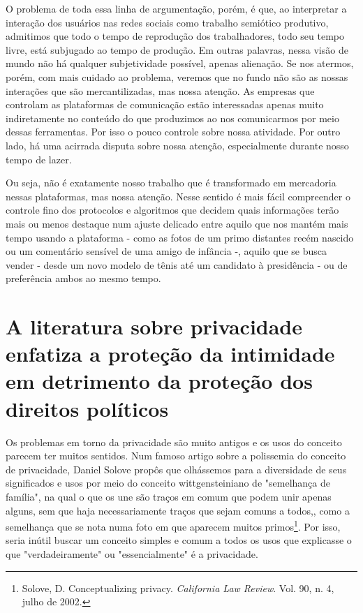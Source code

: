 O problema de toda essa linha de argumentação, porém, é que, ao
interpretar a interação dos usuários nas redes sociais como trabalho
semiótico produtivo, admitimos que todo o tempo de reprodução dos
trabalhadores, todo seu tempo livre, está subjugado ao tempo de
produção. Em outras palavras, nessa visão de mundo não há qualquer
subjetividade possível, apenas alienação. Se nos atermos, porém, com
mais cuidado ao problema, veremos que no fundo não são as nossas
interações que são mercantilizadas, mas nossa atenção. As empresas que
controlam as plataformas de comunicação estão interessadas apenas muito
indiretamente no conteúdo do que produzimos ao nos comunicarmos por meio
dessas ferramentas. Por isso o pouco controle sobre nossa atividade. Por
outro lado, há uma acirrada disputa sobre nossa atenção, especialmente
durante nosso tempo de lazer.

Ou seja, não é exatamente nosso trabalho que é transformado em
mercadoria nessas plataformas, mas nossa atenção. Nesse sentido é mais
fácil compreender o controle fino dos protocolos e algoritmos que
decidem quais informações terão mais ou menos destaque num ajuste
delicado entre aquilo que nos mantém mais tempo usando a plataforma -
como as fotos de um primo distantes recém nascido ou um comentário
sensível de uma amigo de infância -, aquilo que se busca vender - desde
um novo modelo de tênis até um candidato à presidência - ou de
preferência ambos ao mesmo tempo.

\section{A literatura sobre privacidade enfatiza a proteção da intimidade
em detrimento da proteção dos direitos políticos}

Os problemas em torno da privacidade são muito antigos e os usos do
conceito parecem ter muitos sentidos. Num famoso artigo sobre a
polissemia do conceito de privacidade, Daniel Solove propôs que
olhássemos para a diversidade de seus significados e usos por meio do
conceito wittgensteiniano de "semelhança de família", na qual o que os
une são traços em comum que podem unir apenas alguns, sem que haja
necessariamente traços que sejam comuns a todos,, como a semelhança que
se nota numa foto em que aparecem muitos primos\footnote{Solove,
  D. Conceptualizing privacy. \emph{California Law Review}. Vol. 90, n.
  4, julho de 2002.}. Por isso, seria inútil buscar um conceito simples
e comum a todos os usos que explicasse o que "verdadeiramente" ou
"essencialmente" é a privacidade.

